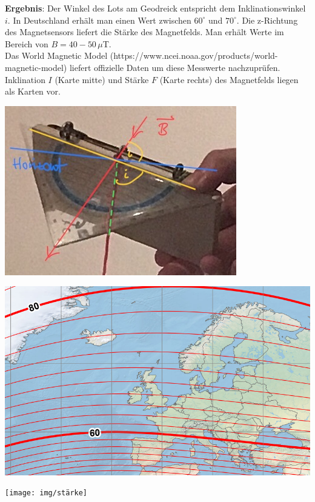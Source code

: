 \documentclass[../main.tex]{subfiles}
\begin{document}
\begin{tcolorbox}
    \vspace{0.5cm}
    \textbf{Ergebnis}: 
    Der Winkel des Lots am Geodreick entspricht dem Inklinationswinkel $i$. In Deutschland erhält man einen Wert zwischen $60^{\circ}$ und $70^{\circ}$. Die z-Richtung des Magnetsensors liefert die Stärke des Magnetfelds. Man erhält Werte im Bereich von $B=40-50\, \mu$T. \\
    Das \glqq World Magnetic Model\grqq{} (https://www.ncei.noaa.gov/products/world-magnetic-model) liefert offizielle Daten um diese Messwerte nachzuprüfen. Inklination $I$ (Karte mitte) und Stärke $F$ (Karte rechts) des Magnetfelds liegen als Karten vor.

    \vspace{0.5cm}
    \begin{center}
        \begin{minipage}[]{0.26\textwidth}
            \includegraphics[width=\textwidth]{img/inklination}  
        \end{minipage}
        \hspace{0.15cm}
        \begin{minipage}[]{0.3\textwidth}
            \includegraphics[width=\textwidth]{img/inklinationskarte}
        \end{minipage}
        \hspace{0.15cm}
        \begin{minipage}[]{0.33\textwidth}
            \texttt{[image: img/stärke]}
        \end{minipage}
    \end{center}


\end{tcolorbox}
\end{document}
